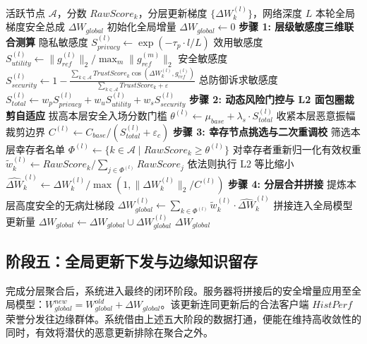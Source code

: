 \documentclass[runningheads]{llncs}
\begin{document}
\begin{algorithm}[htbp]
\caption{基于风险门控的分层差异化聚合与动态裁剪}
\label{alg:phase4}
\begin{algorithmic}[1]
\REQUIRE 活跃节点 $\mathcal{A}$，分数 $RawScore_k$，分层更新梯度 $\{\Delta W_k^{(l)}\}$，网络深度 $L$
\ENSURE 本轮全局梯度安全总成 $\Delta W_{global}$
\STATE 初始化全局增量 $\Delta W_{global} \leftarrow 0$
    \STATE \textbf{步骤 1: 层级敏感度三维联合测算}
    \STATE 隐私敏感度 $S_{privacy}^{(l)} \leftarrow \exp(-\tau_p \cdot l/L)$
    \STATE 效用敏感度 $S_{utility}^{(l)} \leftarrow \|g_{ref}^{(l)}\|_2 / \max_m\|g_{ref}^{(m)}\|_2$
    \STATE 安全敏感度 $S_{security}^{(l)} \leftarrow 1 - \frac{\sum_{k\in\mathcal{A}} TrustScore_k \cos(\Delta W_k^{(l)}, g_{ref}^{(l)})}{\sum_{k\in\mathcal{A}} TrustScore_k + \varepsilon}$
    \STATE 总防御诉求敏感度 $S_{total}^{(l)} \leftarrow w_p S_{privacy}^{(l)} + w_u S_{utility}^{(l)} + w_s S_{security}^{(l)}$
    \STATE \textbf{步骤 2: 动态风险门控与 L2 面包圈裁剪自适应}
    \STATE 拔高本层安全入场分数门槛 $\theta^{(l)} \leftarrow \mu_{base} + \lambda_s \cdot S_{total}^{(l)}$
    \STATE 收紧本层恶意振幅裁剪边界 $C^{(l)} \leftarrow C_{base} / (S_{total}^{(l)} + \varepsilon_c)$
    \STATE \textbf{步骤 3: 幸存节点挑选与二次重调校}
    \STATE 筛选本层幸存者名单 $\Phi^{(l)} \leftarrow \{k \in \mathcal{A} \mid RawScore_k \ge \theta^{(l)}\}$
    \STATE 对幸存者重新归一化有效权重 $\tilde{w}_k^{(l)} \leftarrow RawScore_k / \sum_{j\in\Phi^{(l)}} RawScore_j$
    \STATE 依法则执行 L2 等比缩小 $\widehat{\Delta W}_k^{(l)} \leftarrow \Delta W_k^{(l)} / \max(1, \|\Delta W_k^{(l)}\|_2 / C^{(l)})$
    \STATE \textbf{步骤 4: 分层合并拼接}
    \STATE 提炼本层高度安全的无病灶梯段 $\Delta W_{global}^{(l)} \leftarrow \sum_{k\in\Phi^{(l)}} \tilde{w}_k^{(l)} \cdot \widehat{\Delta W}_k^{(l)}$
    \STATE 拼接连入全局模型更新量 $\Delta W_{global} \leftarrow \Delta W_{global} \cup \Delta W_{global}^{(l)}$
\ENDFOR
\RETURN $\Delta W_{global}$
\end{algorithmic}
\end{algorithm}


\subsection{阶段五：全局更新下发与边缘知识留存}
完成分层聚合后，系统进入最终的闭环阶段。服务器将拼接后的安全增量应用至全局模型：$W_{global}^{new} = W_{global}^{old} + \Delta W_{global}$。该更新连同更新后的合法客户端 $HistPerf$ 荣誉分发往边缘群体。系统借由上述五大阶段的数据打通，便能在维持高收敛性的同时，有效将潜伏的恶意更新排除在聚合之外。
\end{document}
